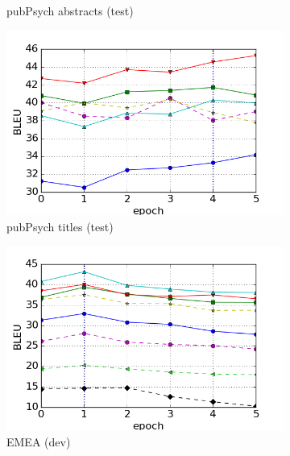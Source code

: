 \documentclass[a4paper,11pt]{article}
\begin{document}
\begin{figure}
\begin{subfigure}[b]{0.45\textwidth}
        \caption{pubPsych abstracts (test)}
        \label{fig:pp_abs_set}
    \end{subfigure}
    \begin{subfigure}[b]{0.45\textwidth}
        \includegraphics[width=\textwidth]{./img/adam/pp_title_test}
        \caption{pubPsych titles (test)}
        \label{fig:pp_tit}
    \end{subfigure}
    \begin{subfigure}[b]{0.45\textwidth}
        \includegraphics[width=\textwidth]{./img/adam/emea_dev}
        \caption{EMEA (dev)}
        \label{fig:emea_dev}
    \end{subfigure}
    \begin{subfigure}[b]{0.45\textwidth}

\end{subfigure}
\end{figure}
\end{document}
